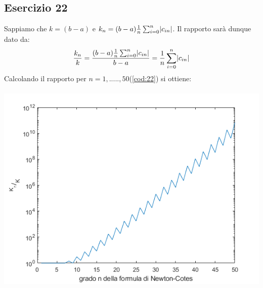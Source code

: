 \subsection{Esercizio 22}
Sappiamo che $k = (b-a)$ e $k_n=(b-a)\frac{1}{n}\sum_{i=0}^{n}\lvert c_{in}\rvert$. Il rapporto sarà dunque dato da: \[\dfrac{k_n}{k} = 
\dfrac{(b-a)\frac{1}{n}\sum_{i=0}^{n}\lvert c_{in}\rvert}{b-a} = \frac{1}{n}\sum_{i=0}^{n}\lvert c_{in}\rvert \]
Calcolando il rapporto per $n = 1,.....,50$(\ref{cod:22}) si ottiene:\\\\
    \includegraphics[width=\linewidth]{capitolo5/ncotes.png}

